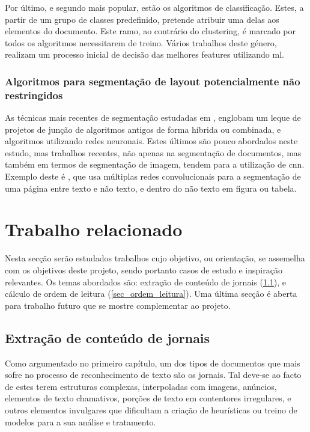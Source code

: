 Por último, e segundo mais popular, estão os algoritmos de classificação. Estes, a partir de um grupo de classes predefinido, pretende atribuir uma delas aos elementos do documento. Este ramo, ao contrário do clustering, é marcado por todos os algoritmos necessitarem de treino. Vários trabalhos deste género, realizam um processo inicial de decisão das melhores features utilizando \acrshort{ml}.

\subsubsection{Algoritmos para segmentação de layout potencialmente não restringidos}

As técnicas mais recentes de segmentação estudadas em \cite{ESKENAZI20171}, englobam um leque de projetos de junção de algoritmos antigos de forma híbrida ou combinada, e algoritmos utilizando redes neuronais. Estes últimos são pouco abordados neste estudo, mas trabalhos recentes, não apenas na segmentação de documentos, mas também em termos de segmentação de imagem, tendem para a utilização de \acrshort{cnn}. Exemplo deste é \cite{8269981}, que usa múltiplas redes convolucionais para a segmentação de uma página entre texto e não texto, e dentro do não texto em figura ou tabela.




\section{Trabalho relacionado}
\label{sec_trab_relacionado}

Nesta secção serão estudados trabalhos cujo objetivo, ou orientação, se assemelha com os objetivos deste projeto, sendo portanto casos de estudo e inspiração relevantes. Os temas abordados são: extração de conteúdo de jornais (\ref{sec_ext_cont_jornais}), e cálculo de ordem de leitura (\ref{sec_ordem_leitura}). Uma última secção é aberta para trabalho futuro que se mostre complementar ao projeto.

\subsection{Extração de conteúdo de jornais}
\label{sec_ext_cont_jornais}

Como argumentado no primeiro capítulo, um dos tipos de documentos que mais sofre no processo de reconhecimento de texto são os jornais. Tal deve-se ao facto de estes terem estruturas complexas, interpoladas com imagens, anúncios, elementos de texto chamativos, porções de texto em contentores irregulares, e outros elementos invulgares que dificultam a criação de heurísticas ou treino de modelos para a sua análise e tratamento.

